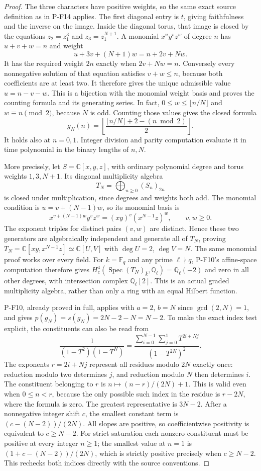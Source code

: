 \begin{proof}
The three characters have positive weights, so the same exact source
definition as in P-F14 applies. The first diagonal entry is $t$,
giving faithfulness and the inverse on the image. Inside the diagonal
torus, that image is closed by the equations
$z_2=z_1^3$ and $z_3=z_1^{N+1}$.
A monomial $x^u y^v z^w$ of degree $n$ has $u+v+w=n$ and weight
\[
 u+3v+(N+1)w=n+2v+Nw.
\]
It has the required weight $2n$ exactly when $2v+Nw=n$.
Conversely every nonnegative solution of that equation satisfies
$v+w\le n$, because both coefficients are at least two.
It therefore gives the unique admissible value $u=n-v-w$.
This is a bijection with the monomial weight basis and proves the
counting formula and its generating series.
In fact, $0\le w\le\lfloor n/N\rfloor$ and
$w\equiv n\pmod2$, because $N$ is odd. Counting those values gives
the closed formula
\[
 g_N(n)=\left\lfloor
 \frac{\lfloor n/N\rfloor+2-(n\bmod2)}2
 \right\rfloor.
\]
It holds also at $n=0,1$. Integer division and parity computation
evaluate it in time polynomial in the binary lengths of $n,N$.

More precisely, let $S=\mathbb C[x,y,z]$, with ordinary polynomial
degree and torus weights $1,3,N+1$. Its diagonal multiplicity algebra
\[
 T_N=\bigoplus_{n\ge0}(S_n)_{2n}
\]
is closed under multiplication, since degrees and weights both add.
The monomial condition is $u=v+(N-1)w$, so its monomial basis is
\[
 x^{v+(N-1)w}y^v z^w=(xy)^v(x^{N-1}z)^w,
 \qquad v,w\ge0.
\]
The exponent triples for distinct pairs $(v,w)$ are distinct.
Hence these two generators are algebraically independent and generate
all of $T_N$, proving
$T_N=\mathbb C[xy,x^{N-1}z]\simeq\mathbb C[U,V]$ with
$\deg U=2$, $\deg V=N$. The same monomial proof works over every
field. For $k=\mathbb F_q$ and any prime $\ell\nmid q$, P-F10's
affine-space computation therefore gives
$H_c^4(\operatorname{Spec}(T_N)_{\overline k},\mathbb Q_\ell)
=\mathbb Q_\ell(-2)$ and zero in all other degrees, with intersection
complex $\mathbb Q_\ell[2]$. This is an actual graded multiplicity
algebra, rather than only a ring with an equal Hilbert function.

P-F10, already proved in full, applies with $a=2$, $b=N$ since
$\gcd(2,N)=1$, and gives
$p(g_N)=s(g_N)=2N-2-N=N-2$. To make the exact index test explicit,
the constituents can also be read from
\[
 \frac1{(1-T^2)(1-T^N)}
 =\frac{\displaystyle\sum_{i=0}^{N-1}\sum_{j=0}^{1}T^{2i+Nj}}
 {(1-T^{2N})^2}.
\]
The exponents $r=2i+Nj$ represent all residues modulo $2N$ exactly
once: reduction modulo two determines $j$, and reduction modulo $N$
then determines $i$. The constituent belonging to $r$ is
$n\mapsto (n-r)/(2N)+1$. This is valid even when $0\le n<r$,
because the only possible such index in the residue is $r-2N$,
where the formula is zero. The greatest representative is $3N-2$.
After a nonnegative integer shift $c$, the smallest constant term
is $(c-(N-2))/(2N)$. All slopes are positive, so coefficientwise
positivity is equivalent to $c\ge N-2$. For strict saturation
each nonzero constituent must be positive at every integer $n\ge1$;
the smallest value at $n=1$ is $(1+c-(N-2))/(2N)$, which is
strictly positive precisely when $c\ge N-2$. This rechecks both
indices directly with the source conventions.


\end{proof}

